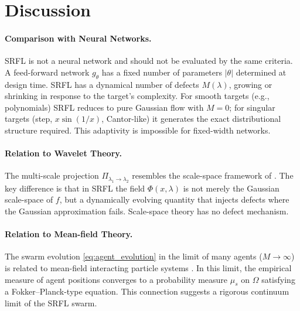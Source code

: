 \documentclass[12pt,a4paper]{article}
\theoremstyle{plain}
\theoremstyle{definition}
\theoremstyle{remark}
\begin{document}
\section{Discussion}
\label{sec:discussion}

\paragraph{Comparison with Neural Networks.}
SRFL is not a neural network and should not be evaluated by the same
criteria.  A feed-forward network $g_\theta$ has a fixed number of
parameters $|\theta|$ determined at design time.  SRFL has a dynamical
number of defects $M(\lambda)$, growing or shrinking in response to the
target's complexity.  For smooth targets (e.g., polynomials) SRFL
reduces to pure Gaussian flow with $M=0$; for singular targets
(step, $x\sin(1/x)$, Cantor-like) it generates the exact distributional
structure required.  This adaptivity is impossible for fixed-width
networks.

\paragraph{Relation to Wavelet Theory.}
The multi-scale projection $\Pi_{\lambda_1\to\lambda_2}$ resembles the
scale-space framework of \cite{lindeberg1994scale}.  The key difference
is that in SRFL the field $\Phi(x,\lambda)$ is not merely the Gaussian
scale-space of $f$, but a dynamically evolving quantity that injects
defects where the Gaussian approximation fails.  Scale-space theory
has no defect mechanism.

\paragraph{Relation to Mean-field Theory.}
The swarm evolution \eqref{eq:agent_evolution} in the limit of many
agents ($M \to \infty$) is related to mean-field interacting particle
systems \cite{mckean1966class}.  In this limit, the empirical measure
of agent positions converges to a probability measure $\mu_s$ on $\Omega$
satisfying a Fokker--Planck-type equation.  This connection suggests
a rigorous continuum limit of the SRFL swarm.
\end{document}
